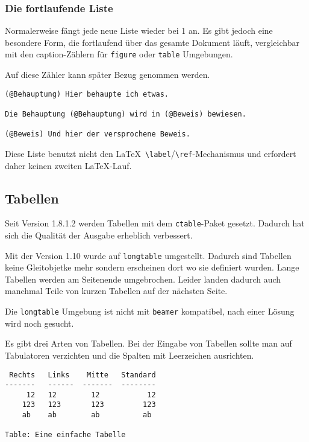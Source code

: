 \documentclass[11pt,ngerman,a4paper]{article}
\begin{document}
\subsubsection{Die fortlaufende Liste}\label{die-fortlaufende-liste}

Normalerweise fängt jede neue Liste wieder bei 1 an. Es gibt jedoch eine
besondere Form, die fortlaufend über das gesamte Dokument läuft,
vergleichbar mit den caption-Zählern für \texttt{figure} oder
\texttt{table} Umgebungen.

Auf diese Zähler kann später Bezug genommen werden.

\begin{verbatim}
(@Behauptung) Hier behaupte ich etwas.

Die Behauptung (@Behauptung) wird in (@Beweis) bewiesen.

(@Beweis) Und hier der versprochene Beweis. 
\end{verbatim}

Diese Liste benutzt nicht den
LaTeX~\texttt{\textbackslash{}label}/\texttt{\textbackslash{}ref}-Mechanismus
und erfordert daher keinen zweiten LaTeX-Lauf.

\subsection{Tabellen}\label{tabellen}

Seit Version 1.8.1.2 werden Tabellen mit dem \texttt{ctable}-Paket
gesetzt. Dadurch hat sich die Qualität der Ausgabe erheblich verbessert.

Mit der Version 1.10 wurde auf \texttt{longtable} umgestellt. Dadurch
sind Tabellen keine Gleitobjetke mehr sondern erscheinen dort wo sie
definiert wurden. Lange Tabellen werden am Seitenende umgebrochen.
Leider landen dadurch auch manchmal Teile von kurzen Tabellen auf der
nächsten Seite.

Die \texttt{longtable} Umgebung ist nicht mit \texttt{beamer}
kompatibel, nach einer Lösung wird noch gesucht.

Es gibt drei Arten von Tabellen. Bei der Eingabe von Tabellen sollte man
auf Tabulatoren verzichten und die Spalten mit Leerzeichen ausrichten.

\begin{verbatim}
 Rechts   Links    Mitte   Standard
-------   ------  -------  --------
     12   12        12           12
    123   123       123         123
    ab    ab        ab          ab

Table: Eine einfache Tabelle
\end{verbatim}
\end{document}
